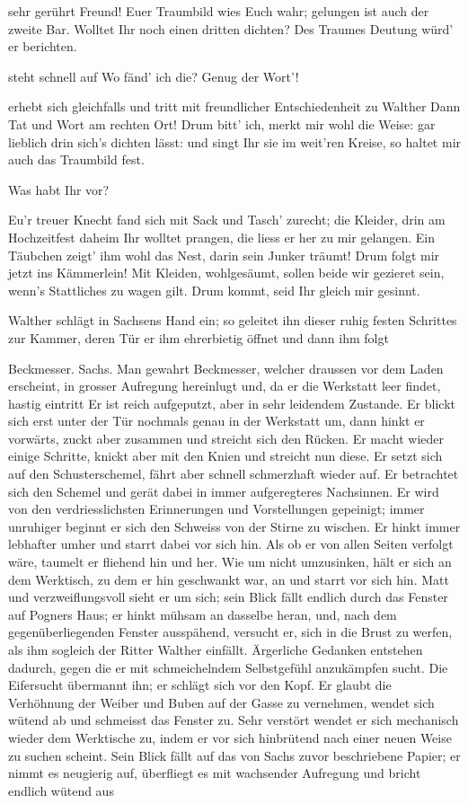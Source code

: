 \begin{drama}
\Sachsspeaks
sehr gerührt
Freund!
Euer Traumbild wies Euch wahr;
gelungen ist auch der zweite Bar.
Wolltet Ihr noch einen dritten dichten?
Des Traumes Deutung würd' er berichten.

\Waltherspeaks
steht schnell auf
Wo fänd' ich die? Genug der Wort'!

\Sachsspeaks
erhebt sich gleichfalls und tritt mit freundlicher Entschiedenheit zu Walther
Dann Tat und Wort am rechten Ort!
Drum bitt' ich, merkt mir wohl die Weise:
gar lieblich drin sich's dichten lässt:
und singt Ihr sie im weit'ren Kreise,
so haltet mir auch das Traumbild fest.

\Waltherspeaks
Was habt Ihr vor?

\Sachsspeaks
Eu'r treuer Knecht
fand sich mit Sack und Tasch' zurecht;
die Kleider, drin am Hochzeitfest
daheim Ihr wolltet prangen,
die liess er her zu mir gelangen.
Ein Täubchen zeigt' ihm wohl das Nest,
darin sein Junker träumt!
Drum folgt mir jetzt ins Kämmerlein!
Mit Kleiden, wohlgesäumt,
sollen beide wir gezieret sein,
wenn's Stattliches zu wagen gilt.
Drum kommt, seid Ihr gleich mir gesinnt.

Walther schlägt in Sachsens Hand ein; so geleitet ihn dieser ruhig festen Schrittes zur Kammer, deren Tür er ihm ehrerbietig öffnet und dann ihm folgt


\scene

Beckmesser. Sachs. Man gewahrt Beckmesser, welcher draussen vor dem Laden erscheint, in grosser Aufregung hereinlugt und, da er die Werkstatt leer findet, hastig eintritt Er ist reich aufgeputzt, aber in sehr leidendem Zustande. Er blickt sich erst unter der Tür nochmals genau in der Werkstatt um, dann hinkt er vorwärts, zuckt aber zusammen und streicht sich den Rücken. Er macht wieder einige Schritte, knickt aber mit den Knien und streicht nun diese. Er setzt sich auf den Schusterschemel, fährt aber schnell schmerzhaft wieder auf. Er betrachtet sich den Schemel und gerät dabei in immer aufgeregteres Nachsinnen. Er wird von den verdriesslichsten Erinnerungen und Vorstellungen gepeinigt; immer unruhiger beginnt er sich den Schweiss von der Stirne zu wischen. Er hinkt immer lebhafter umher und starrt dabei vor sich hin. Als ob er von allen Seiten verfolgt wäre, taumelt er fliehend hin und her. Wie um nicht umzusinken, hält er sich an dem Werktisch, zu dem er hin geschwankt war, an und starrt vor sich hin. Matt und verzweiflungsvoll sieht er um sich; sein Blick fällt endlich durch das Fenster auf Pogners Haus; er hinkt mühsam an dasselbe heran, und, nach dem gegenüberliegenden Fenster ausspähend, versucht er, sich in die Brust zu werfen, als ihm sogleich der Ritter Walther einfällt. Ärgerliche Gedanken entstehen dadurch, gegen die er mit schmeichelndem Selbstgefühl anzukämpfen sucht. Die Eifersucht übermannt ihn; er schlägt sich vor den Kopf. Er glaubt die Verhöhnung der Weiber und Buben auf der Gasse zu vernehmen, wendet sich wütend ab und schmeisst das Fenster zu. Sehr verstört wendet er sich mechanisch wieder dem Werktische zu, indem er vor sich hinbrütend nach einer neuen Weise zu suchen scheint. Sein Blick fällt auf das von Sachs zuvor beschriebene Papier; er nimmt es neugierig auf, überfliegt es mit wachsender Aufregung und bricht endlich wütend aus


\end{drama}
